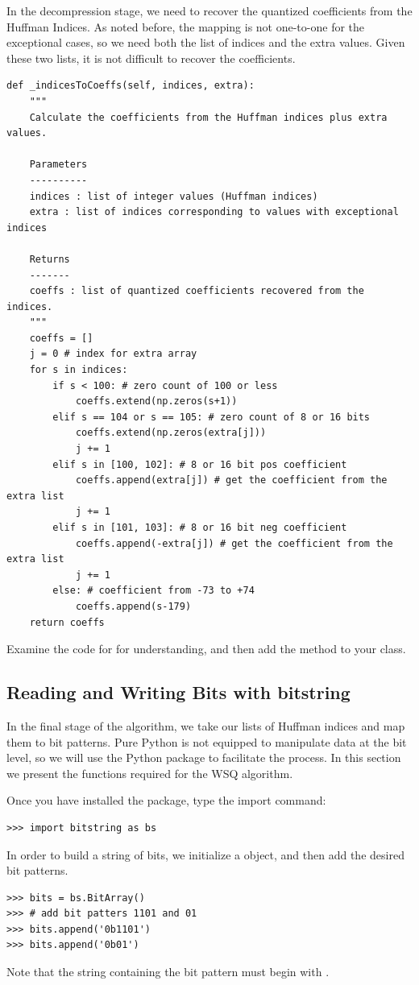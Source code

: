 In the decompression stage, we need to recover the quantized coefficients from the Huffman Indices.
As noted before, the mapping is not one-to-one for the exceptional cases, so we need both the list
of indices and the extra values.
Given these two lists, it is not difficult to recover the coefficients.
\begin{lstlisting}
def _indicesToCoeffs(self, indices, extra):
    """
    Calculate the coefficients from the Huffman indices plus extra values.

    Parameters
    ----------
    indices : list of integer values (Huffman indices)
    extra : list of indices corresponding to values with exceptional indices

    Returns
    -------
    coeffs : list of quantized coefficients recovered from the indices.
    """
    coeffs = []
    j = 0 # index for extra array
    for s in indices:
        if s < 100: # zero count of 100 or less
            coeffs.extend(np.zeros(s+1))
        elif s == 104 or s == 105: # zero count of 8 or 16 bits
            coeffs.extend(np.zeros(extra[j]))
            j += 1
        elif s in [100, 102]: # 8 or 16 bit pos coefficient
            coeffs.append(extra[j]) # get the coefficient from the extra list
            j += 1
        elif s in [101, 103]: # 8 or 16 bit neg coefficient
            coeffs.append(-extra[j]) # get the coefficient from the extra list
            j += 1
        else: # coefficient from -73 to +74
            coeffs.append(s-179)
    return coeffs
\end{lstlisting}
\begin{problem}
Examine the code for  for understanding, and then add the method to your class.
\end{problem}
\subsection*{Reading and Writing Bits with bitstring}
In the final stage of the algorithm, we take our lists of Huffman indices and map them to bit patterns.
Pure Python is not equipped to manipulate data
at the bit level, so we will use the Python package  to facilitate the process.
In this section we present the functions required for the WSQ algorithm.

Once you have installed the package, type the import command:
\begin{lstlisting}
>>> import bitstring as bs
\end{lstlisting}
In order to build a string of bits, we initialize a  object, and then add the
desired bit patterns.
\begin{lstlisting}
>>> bits = bs.BitArray()
>>> # add bit patters 1101 and 01
>>> bits.append('0b1101')
>>> bits.append('0b01')
\end{lstlisting}
Note that the string containing the bit pattern must begin with .

